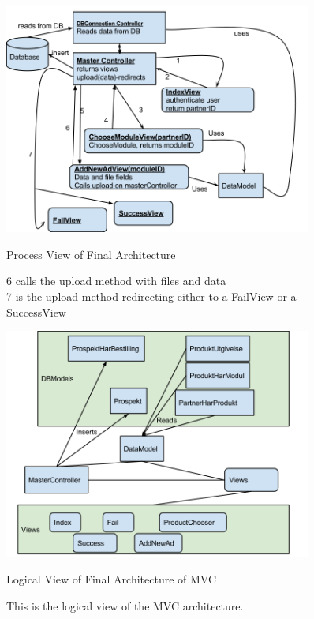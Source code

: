 \begin{center}
\begin{figure}[H]
\centering
\includegraphics[width=0.9\textwidth]{images/architecture_final01.png}
\caption{Process View of Final Architecture}
\caption*{6 calls the upload method with files and data\\
7 is the upload method redirecting either to a FailView or a SuccessView}
\label{fig:process_view}
\end{figure}
\end{center}

\begin{center}
\begin{figure}[H]
\centering
\includegraphics[width=0.9\textwidth]{images/architecture_final02.png}
\caption{Logical View of Final Architecture of MVC}
\caption*{This is the logical view of the MVC architecture.}
\label{fig:logical_view1}
\end{figure}
\end{center}


